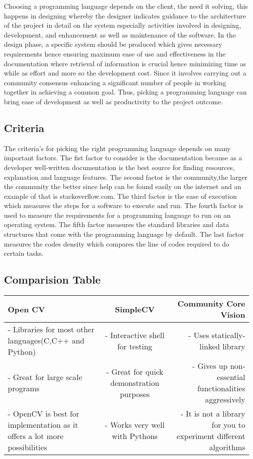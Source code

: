 \documentclass{scrreprt}
\begin{document}
Choosing a programming language depends on the client, the need it solving, this happens in designing
whereby the designer indicates guidance to the architecture of the project in detail on the system
especially activities involved in designing, development, and enhancement as well as maintenance of the
software. In the design phase, a specific system should be produced which gives necessary requirements
hence ensuring maximum ease of use and effectiveness in the documentation where retrieval of
information is crucial hence minimizing time as while as effort and more so the development cost. Since
it involves carrying out a community consensus enhancing a significant number of people in working
together in achieving a common goal. Thus, picking a programming language can bring ease of
development as well as productivity to the project outcome.

\subsection{Criteria}
The criteria’s for picking the right programming language depends on many important factors. The fist
factor to consider is the documentation because as a developer well-written documentation is the best
source for finding resources, explanation and language features. The second factor is the community,the larger the community the better since help can be found easily on the internet and an example of
that is stackoverflow.com. The third factor is the ease of execution which measures the steps for a
software to execute and run. The fourth factor is used to measure the requirements for a programming
language to run on an operating system. The fifth factor measures the standard libraries and data
structures that come with the programming language by default. The last factor measures the codes
density which compares the line of codes required to do certain tasks.

\subsection{Comparision Table}
\begin{center}
  \begin{tabular}{| l | c | r |}
    \hline
    Open CV & SimpleCV & Community Core Vision \\ \hline
    \parbox{5cm}{- Libraries for most other languages(C,C++ and Python)} & \parbox{5cm}{- Interactive shell for testing} & \parbox{5cm}{- Uses statically-linked library} \\
    \parbox{5cm}{- Great for large scale programs} & \parbox{5cm}{- Great for quick demonstration purposes} & \parbox{5cm}{- Gives up non-essential functionalities aggressively} \\
    \parbox{5cm}{- OpenCV is best for implementation as it offers a lot more possibilities} & \parbox{5cm}{- Works very well with Pythons} & \parbox{5cm}{- It is not a library for you to experiment different algorithms} \\
    \hline
  \end{tabular}
\end{center}
\end{document}
